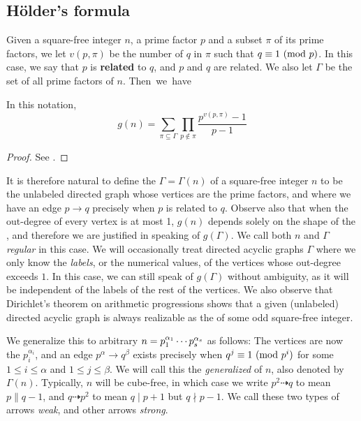 \subsection{Hölder's formula}
Given a square-free integer $n$, a prime factor $p$ and a subset $\pi$ of its prime factors, we let $v(p, \pi)$ be the number of $q$ in $\pi$ such that $q \equiv 1 \ (\mathrm{mod} \ p)$. In this case, we say that $p$ is \textbf{related} to $q$, and $p$ and $q$ are related. We also let $\Gamma$ be the set of all prime factors of $n$. \mbox{Then we have}
\begin{thm} In this notation,
	\begin{equation*}
		g(n) = \sum_{\pi \subseteq \Gamma} \prod_{p \notin \pi} \frac{p^{v(p, \pi)} - 1}{p - 1}
	\end{equation*}
\end{thm}
\begin{proof} See {\cite[Thm.~5.1]{gnumoas}}. \end{proof}

It is therefore natural to define the \emph{} $\Gamma = \Gamma(n)$ of a square-free integer $n$ to be the unlabeled directed graph whose vertices are the prime factors, and where we have an edge $p \rightarrow q$ precisely when $p$ is related to $q$. Observe also that when the out-degree of every vertex is at most 1, $g(n)$ depends solely on the shape of the , and therefore we are justified in speaking of $g(\Gamma).$ We call both $n$ and $\Gamma$ \emph{regular} in this case. We will occasionally treat directed acyclic graphs $\Gamma$ where we only know the \emph{labels}, or the numerical values, of the vertices whose out-degree exceeds $1$. In this case, we can still speak of $g(\Gamma)$ without ambiguity, as it will be independent of the labels of the rest of the vertices. We also observe that Dirichlet's theorem on arithmetic progressions shows that a given (unlabeled) directed acyclic graph is always realizable as the  of some odd square-free integer.

We generalize this to arbitrary $n = p_1^{\alpha_1} \cdots p_s^{\alpha_s}$ as follows: The vertices are now the $p_i^{\alpha_i}$, and an edge $p^\alpha \rightarrow q^\beta$ exists precisely when $q^j \equiv 1 \ (\mathrm{mod} \ p^i)$ for some $1 \le i \le \alpha$ and $1 \le j \le \beta$. We will call this the \emph{generalized \hg} of $n$, also denoted by $\Gamma(n)$. Typically, $n$ will be cube-free, in which case we write $p^2 \dashrightarrow q$ to mean $p \parallel q - 1$, and $q \dashrightarrow p^2$ to mean $q \mid p + 1$ but $q \nmid p - 1$. We call these two types of arrows \emph{weak}, and other arrows \emph{strong}.

